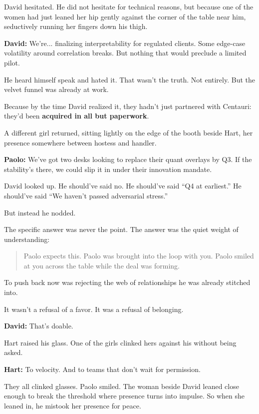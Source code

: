David hesitated. He did not hesitate for technical reasons, but because one of the women had just leaned her hip gently against 
the corner of the table near him, seductively running her fingers down his thigh.

\textbf{David:}  
We’re... finalizing interpretability for regulated clients.  
Some edge-case volatility around correlation breaks.  
But nothing that would preclude a limited pilot.

He heard himself speak and hated it.  
That wasn’t the truth. Not entirely.  
But the velvet funnel was already at work.

Because by the time David realized it, they hadn’t just partnered with Centauri:  
they’d been \textbf{acquired in all but paperwork}.

A different girl returned, sitting lightly on the edge of the booth beside Hart, her presence somewhere between 
hostess and handler.

\textbf{Paolo:}  
We’ve got two desks looking to replace their quant overlays by Q3.  
If the stability’s there, we could slip it in under their innovation mandate.

David looked up.  
He should’ve said no.  
He should’ve said “Q4 at earliest.”  
He should’ve said “We haven’t passed adversarial stress.”

But instead he nodded.

The specific answer was never the point. The answer was the quiet weight of understanding:  

\begin{quote}
  Paolo expects this. Paolo was brought into the loop with you. 
  Paolo smiled at you across the table while the deal 
  was forming.
\end{quote}

To push back now was rejecting the web of relationships he was already stitched into.  

It wasn’t a refusal of a favor.  It was a refusal of belonging.

\textbf{David:}  
That’s doable.

Hart raised his glass. One of the girls clinked hers against his without being asked.

\textbf{Hart:}  
To velocity.  
And to teams that don’t wait for permission.

They all clinked glasses.  
Paolo smiled.  
The woman beside David leaned close enough to break the threshold where presence turns into 
impulse. So when she leaned in, he mistook her presence for peace.

